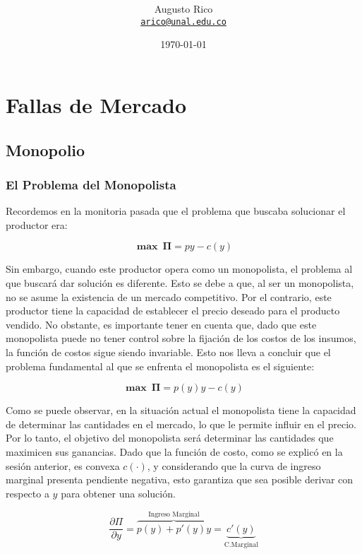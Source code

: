 \documentclass[11pt]{article}
\title{\text{Microeconomia III - $2^a$ Monitoria}
}
\author{Augusto Rico\\%
    \href{mailto:arico@unal.edu.co}{\texttt{arico@unal.edu.co}}
    }
\date{\today}
\begin{document}
\maketitle


\section{Fallas de Mercado}

\subsection{Monopolio}

\subsubsection{El Problema del Monopolista}

\begin{flushleft}
    Recordemos en la monitoria pasada que el problema que buscaba solucionar el productor era:

    $$\boldsymbol{\max ~ \Pi} = py-c(y)$$
    
    Sin embargo, cuando este productor opera como un monopolista, el problema al que buscará dar solución es diferente. Esto se debe a que, al ser un monopolista, no se asume la existencia de un mercado competitivo. Por el contrario, este productor tiene la capacidad de establecer el precio deseado para el producto vendido. No obstante, es importante tener en cuenta que, dado que este monopolista puede no tener control sobre la fijación de los costos de los insumos, la función de costos sigue siendo invariable. Esto nos lleva a concluir que el problema fundamental al que se enfrenta el monopolista es el siguiente:
    
    $$\boldsymbol{\max ~ \Pi} = p(y)y-c(y)$$
    
    Como se puede observar, en la situación actual el monopolista tiene la capacidad de determinar las cantidades en el mercado, lo que le permite influir en el precio. Por lo tanto, el objetivo del monopolista será determinar las cantidades que maximicen sus ganancias. Dado que la función de costo, como se explicó en la sesión anterior, es convexa $c(\cdot)$, y considerando que la curva de ingreso marginal presenta pendiente negativa, esto garantiza que sea posible derivar con respecto a $y$ para obtener una solución.
    
    $$\frac{\partial \Pi}{\partial y} = \overbrace{p(y)+p'(y)y}^{\text{Ingreso Marginal}}=\underbrace{c'(y)}_{\text{C.Marginal}}$$

\end{flushleft}
\end{document}
